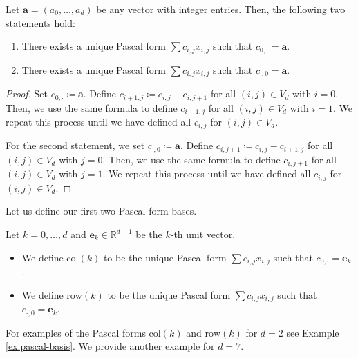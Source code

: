 \begin{proposition}\label{prop:supsup-pascal}
    Let \( \mathbf{a} = (a_0, \dots, a_d) \) be any vector with integer entries. Then, the following two statements hold:
    \begin{enumerate}
        \item There exists a unique Pascal form \( \sum c_{i,j}x_{i,j} \) such that \( c_{0,\cdot} = \mathbf a \).
        \item There exists a unique Pascal form \( \sum c_{i,j}x_{i,j} \) such that \( c_{\cdot,0} = \mathbf a \).
    \end{enumerate}
\end{proposition}

\begin{proof}
    Set \( c_{0,\cdot} \coloneqq \mathbf a \). Define \( c_{i+1,j} \coloneqq c_{i,j} - c_{i,j+1}\) for all \( (i,j) \in V_d \) with \( i=0 \). Then, we use the same formula to define \( c_{i+1,j} \) for all \( (i,j) \in V_d \) with \( i=1 \). We repeat this process until we have defined all \( c_{i,j} \) for \( (i,j) \in V_d \).

    For the second statement, we set \( c_{\cdot,0} \coloneqq \mathbf a \). Define \( c_{i,j+1} \coloneqq c_{i,j} - c_{i+1,j}\) for all \( (i,j) \in V_d \) with \( j=0 \). Then, we use the same formula to define \( c_{i,j+1} \) for all \( (i,j) \in V_d \) with \( j=1 \). We repeat this process until we have defined all \( c_{i,j} \) for \( (i,j) \in V_d \).
\end{proof}

Let us define our first two Pascal form bases.

\begin{definition}\label{def:row-col}
    Let \( k = 0, \dots, d \) and \( \mathbf e_k \in \mathbb{R}^{d+1} \) be the \( k \)-th unit vector. 
    \begin{itemize}
        \item We define \( \mathrm{col}(k) \) to be the unique Pascal form \( \sum c_{i,j}x_{i,j} \) such that \( c_{0,\cdot} = \mathbf e_k \).
        \item We define \( \mathrm{row}(k) \) to be the unique Pascal form \( \sum c_{i,j}x_{i,j} \) such that \( c_{\cdot,0} = \mathbf e_k \).
    \end{itemize}
\end{definition}

For examples of the Pascal forms \( \mathrm{col}(k) \) and \( \mathrm{row}(k) \) for \( d = 2 \) see Example \ref{ex:pascal-basis}. We provide another example for \( d = 7 \).

